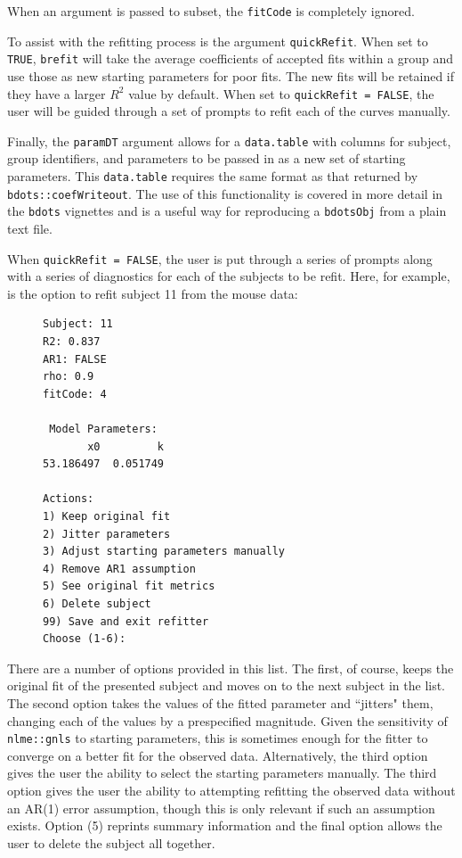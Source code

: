 \documentclass{article}
\newcommand{\xt}{\texttt}%
\begin{document}
When an argument is passed to subset, the \xt{fitCode} is completely ignored.

To assist with the refitting process is the argument \xt{quickRefit}. When set to \xt{TRUE}, \xt{brefit} will take the average coefficients of accepted fits within a group and use those as new starting parameters for poor fits. The new fits will be retained if they have a larger $R^2$ value by default. When set to \xt{quickRefit = FALSE}, the user will be guided through a set of prompts to refit each of the curves manually. 

Finally, the \texttt{paramDT} argument allows for a \xt{data.table} with columns for subject, group identifiers, and parameters to be passed in as a new set of starting parameters. This \xt{data.table} requires the same format as that returned by \xt{bdots::coefWriteout}. The use of this functionality is covered in more detail in the \xt{bdots} vignettes and is a useful way for reproducing a \xt{bdotsObj} from a plain text file. 

When \texttt{quickRefit = FALSE}, the user is put through a series of prompts along with a series of diagnostics for each of the subjects to be refit. Here, for example, is the option to refit subject 11 from the mouse data:


\begin{singlespace}
\begin{figure}[H]
\centering
\begin{BVerbatim}
Subject: 11
R2: 0.837
AR1: FALSE
rho: 0.9
fitCode: 4

 Model Parameters:
       x0         k 
53.186497  0.051749 

Actions:
1) Keep original fit
2) Jitter parameters
3) Adjust starting parameters manually
4) Remove AR1 assumption
5) See original fit metrics
6) Delete subject
99) Save and exit refitter
Choose (1-6):
\end{BVerbatim}
\end{figure}
\end{singlespace}

There are a number of options provided in this list. The first, of course, keeps the original fit of the presented subject and moves on to the next subject in the list. The second option takes the values of the fitted parameter and ``jitters" them, changing each of the values by a prespecified magnitude. Given the sensitivity of \xt{nlme::gnls} to starting parameters, this is sometimes enough for the fitter to converge on a better fit for the observed data. Alternatively, the third option gives the user the ability to select the starting parameters manually. The third option gives the user the ability to attempting refitting the observed data without an AR(1) error assumption, though this is only relevant if such an assumption exists. Option (5) reprints summary information and the final option allows the user to delete the subject all together.
\end{document}
